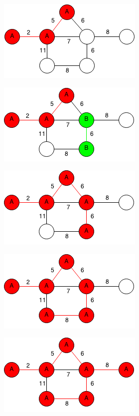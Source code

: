 \documentclass[11pt,oneside]{book}
\makeatletter
\def\maxwidth#1{\ifdim\Gin@nat@width>#1 #1\else\Gin@nat@width\fi}
\makeatother
\begin{document}
\vspace{5px}\includegraphics[width=\maxwidth{\textwidth}]{kruskal3.png}

\vspace{5px}\includegraphics[width=\maxwidth{\textwidth}]{kruskal4.png}

\vspace{5px}\includegraphics[width=\maxwidth{\textwidth}]{kruskal5.png}

\vspace{5px}\includegraphics[width=\maxwidth{\textwidth}]{kruskal6.png}

\vspace{5px}\includegraphics[width=\maxwidth{\textwidth}]{kruskal7.png}
\end{document}
